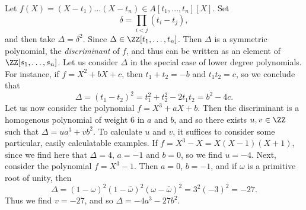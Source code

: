 \begin{example}
    Let $f(X) = (X - t_1) \dots (X - t_n) \in A[t_1,\dots,t_n][X]$. Set
    \[ \delta = \prod_{i < j} (t_i - t_j), \]
    and then take $\Delta = \delta^2$. Since $\Delta \in \ZZ[t_1,\dots,t_n]$. Then $\Delta$ is a symmetric polynomial, the \emph{discriminant} of $f$, and thus can be written as an element of $\ZZ[s_1,\dots,s_n]$. Let us consider $\Delta$ in the special case of lower degree polynomials. For instance, if $f = X^2 + bX + c$, then $t_1 + t_2 = -b$ and $t_1t_2 = c$, so we conclude that
    \[ \Delta = (t_1 - t_2)^2 = t_1^2 + t_2^2 - 2t_1t_2 = b^2 - 4c. \]
    Let us now consider the polynomial $f = X^3 + aX + b$. Then the discriminant is a homogenous polynomial of weight $6$ in $a$ and $b$, and so there exists $u,v \in \ZZ$ such that $\Delta = ua^3 + vb^2$. To calculate $u$ and $v$, it suffices to consider some particular, easily calculatable examples. If $f = X^3 - X = X(X-1)(X+1)$, since we find here that $\Delta = 4$, $a = -1$ and $b = 0$, so we find $u = -4$. Next, consider the polynomial $f = X^3 - 1$. Then $a = 0$, $b = -1$, and if $\omega$ is a primitive root of unity, then
    \[ \Delta = (1 - \omega)^2 (1 - \overline{\omega})^2 ( \omega - \overline{\omega} )^2 = 3^2 (-3)^2 = -27. \]
    Thus we find $v = -27$, and so $\Delta = -4a^3 - 27b^2$.
\end{example}

